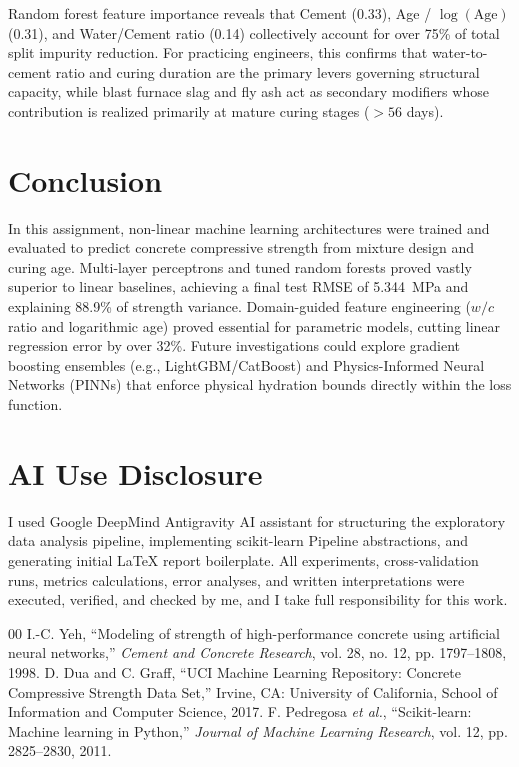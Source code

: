 \documentclass[conference]{IEEEtran}
\begin{document}
Random forest feature importance reveals that Cement (0.33), Age / $\log(\text{Age})$ (0.31), and Water/Cement ratio (0.14) collectively account for over 75\% of total split impurity reduction. For practicing engineers, this confirms that water-to-cement ratio and curing duration are the primary levers governing structural capacity, while blast furnace slag and fly ash act as secondary modifiers whose contribution is realized primarily at mature curing stages ($>56$ days).

\section{Conclusion}
In this assignment, non-linear machine learning architectures were trained and evaluated to predict concrete compressive strength from mixture design and curing age. Multi-layer perceptrons and tuned random forests proved vastly superior to linear baselines, achieving a final test RMSE of 5.344~MPa and explaining 88.9\% of strength variance. Domain-guided feature engineering ($w/c$ ratio and logarithmic age) proved essential for parametric models, cutting linear regression error by over 32\%. Future investigations could explore gradient boosting ensembles (e.g., LightGBM/CatBoost) and Physics-Informed Neural Networks (PINNs) that enforce physical hydration bounds directly within the loss function.

\section*{AI Use Disclosure}
I used Google DeepMind Antigravity AI assistant for structuring the exploratory data analysis pipeline, implementing scikit-learn Pipeline abstractions, and generating initial LaTeX report boilerplate. All experiments, cross-validation runs, metrics calculations, error analyses, and written interpretations were executed, verified, and checked by me, and I take full responsibility for this work.

\begin{thebibliography}{00}
 I.-C. Yeh, ``Modeling of strength of high-performance concrete using artificial neural networks,'' \textit{Cement and Concrete Research}, vol. 28, no. 12, pp. 1797--1808, 1998.
 D. Dua and C. Graff, ``UCI Machine Learning Repository: Concrete Compressive Strength Data Set,'' Irvine, CA: University of California, School of Information and Computer Science, 2017.
 F. Pedregosa \textit{et al.}, ``Scikit-learn: Machine learning in Python,'' \textit{Journal of Machine Learning Research}, vol. 12, pp. 2825--2830, 2011.
\end{thebibliography}
\end{document}
